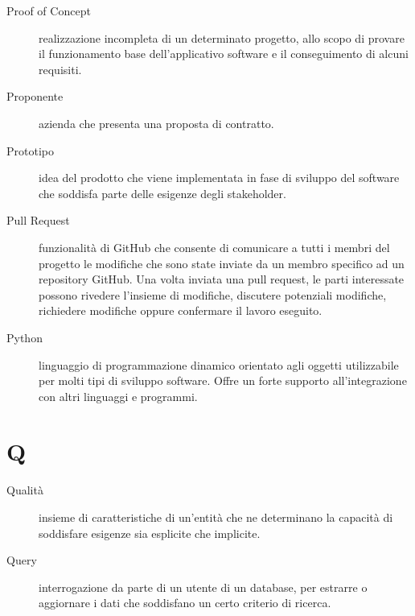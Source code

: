 \documentclass{article}
\begin{document}
\begin{description}
  \item[Proof of Concept] realizzazione incompleta di un determinato progetto, allo scopo di provare il funzionamento base dell'applicativo software e il conseguimento di alcuni requisiti.
  \item[Proponente] azienda che presenta una proposta di contratto.
  \item[Prototipo] idea del prodotto che viene implementata in fase di sviluppo del software che soddisfa parte delle esigenze degli stakeholder.
  \item[Pull Request] funzionalità di GitHub che consente di comunicare a tutti i membri del progetto le modifiche che sono state inviate da un membro specifico ad un repository GitHub. Una volta inviata una pull request, le parti interessate possono rivedere l'insieme di modifiche, discutere potenziali modifiche, richiedere modifiche oppure confermare il lavoro eseguito.
  \item[Python] linguaggio di programmazione dinamico orientato agli oggetti utilizzabile per molti tipi di sviluppo software. Offre un forte supporto all'integrazione con altri linguaggi e programmi.
\end{description}
\newpage
\section{Q}
\begin{description}
  \item[Qualità] insieme di caratteristiche di un'entità che ne determinano la capacità di soddisfare esigenze sia esplicite che implicite.
  \item[Query] interrogazione da parte di un utente di un database, per estrarre o aggiornare i dati che soddisfano un certo criterio di ricerca.
\end{description}
\newpage
\end{document}
